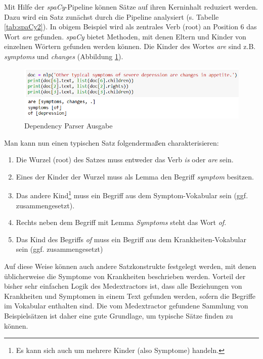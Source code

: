 Mit Hilfe der \emph{spaCy}-Pipeline können Sätze auf ihren Kerninhalt reduziert werden. Dazu wird ein Satz zunächst durch die Pipeline analysiert (s. Tabelle \ref{tab:spaCy2}). In obigem Beispiel wird als zentrales Verb (root) an Position 6 das Wort \emph{are} gefunden. \emph{spaCy} bietet Methoden, mit denen Eltern und Kinder von einzelnen Wörtern gefunden werden können. Die Kinder des Wortes \emph{are} sind z.B. \emph{symptoms} und \emph{changes} (Abbildung \ref{fig:typ_phrase}). 

\begin{figure}[h]
    \centering
    \includegraphics[width=\textwidth]{pictures/Dep_Parser_Text.png}
    \caption{Dependency Parser Ausgabe}
    \label{fig:typ_phrase}
\end{figure}

Man kann nun einen typischen Satz folgendermaßen charakterisieren:

\begin{enumerate}
	\item Die Wurzel (root) des Satzes muss entweder das Verb \emph{is} oder \emph{are} sein.
	\item Eines der Kinder der Wurzel muss als Lemma den Begriff \emph{symptom} besitzen.
	\item Das andere Kind\footnote{Es kann sich auch um mehrere Kinder (also Symptome) handeln.} muss ein Begriff aus dem Symptom-Vokabular sein (ggf. zusammengesetzt).
	\item Rechts neben dem Begriff mit Lemma \emph{Symptoms} steht das Wort \emph{of}.
	\item Das Kind des Begriffs \emph{of} muss ein Begriff aus dem Krankheiten-Vokabular sein (ggf. zusammengesetzt)
\end{enumerate}

Auf diese Weise können auch andere Satzkonstrukte festgelegt werden, mit denen üblicherweise die Symptome von Krankheiten beschrieben werden. Vorteil der bisher sehr einfachen Logik des Medextractors ist, dass alle Beziehungen von Krankheiten und Symptomen in einem Text gefunden werden, sofern die Begriffe im Vokabular enthalten sind. Die vom Medextractor gefundene Sammlung von Beispielsätzen ist daher eine gute Grundlage, um typische Sätze finden zu können.
